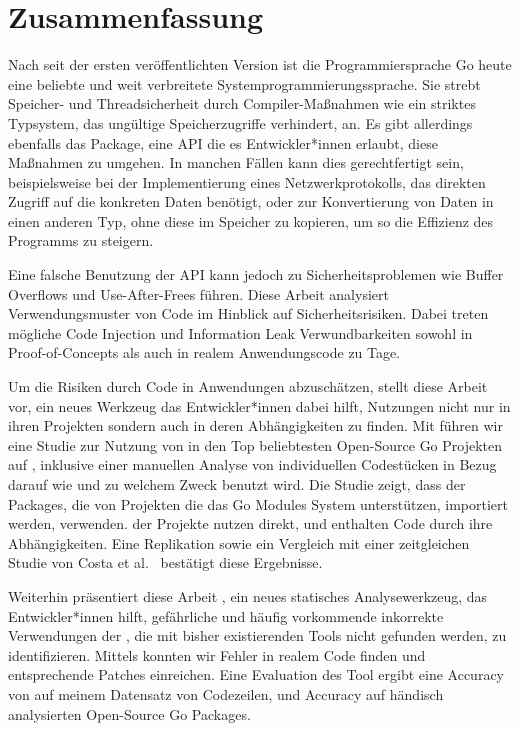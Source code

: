 \chapter*{Zusammenfassung}

Nach  seit der ersten veröffentlichten Version ist die Programmiersprache Go heute eine
beliebte und weit verbreitete Systemprogrammierungssprache.
Sie strebt Speicher- und Threadsicherheit durch Compiler-Maßnahmen wie ein striktes Typsystem, das
ungültige Speicherzugriffe verhindert, an.
Es gibt allerdings ebenfalls das \unsafe{} Package, eine API die es Entwickler*innen erlaubt, diese
Maßnahmen zu umgehen.
In manchen Fällen kann dies gerechtfertigt sein, beispielsweise bei der Implementierung eines
Netzwerkprotokolls, das direkten Zugriff auf die konkreten Daten benötigt, oder zur Konvertierung von Daten in einen
anderen Typ, ohne diese im Speicher zu kopieren, um so die Effizienz des Programms zu steigern.

Eine falsche Benutzung der \unsafe{} API kann jedoch zu Sicherheitsproblemen wie Buffer Overflows und Use-After-Frees
führen.
Diese Arbeit analysiert Verwendungsmuster von \unsafe{} Code im Hinblick auf Sicherheitsrisiken.
Dabei treten mögliche Code Injection und Information Leak Verwundbarkeiten sowohl in Proof-of-Concepts als auch in
realem Anwendungscode zu Tage.

Um die Risiken durch \unsafe{} Code in Anwendungen abzuschätzen, stellt diese Arbeit \toolGeiger{} vor, ein neues
Werkzeug das Entwickler*innen dabei hilft, \unsafe{} Nutzungen nicht nur in ihren Projekten sondern auch in deren
Abhängigkeiten zu finden.
Mit \toolGeiger{} führen wir eine Studie zur Nutzung von \unsafe{} in den Top \projsTotal{} beliebtesten Open-Source Go
Projekten auf \github{}, inklusive einer manuellen Analyse von \numberLabeledCodeSnippets{} individuellen Codestücken
in Bezug darauf wie und zu welchem Zweck \unsafe{} benutzt wird.
Die Studie zeigt, dass \percentageUnsafePackages{} der Packages, die von Projekten die das Go Modules System
unterstützen, importiert werden, \unsafe{} verwenden.
\percentageUnsafeProjects{} der Projekte nutzen \unsafe{} direkt, und \percentageUnsafeTransitiveWithDependencies{}
enthalten \unsafe{} Code durch ihre Abhängigkeiten.
Eine Replikation sowie ein Vergleich mit einer zeitgleichen Studie von Costa et al.~\cite{costa2020} bestätigt diese
Ergebnisse.

Weiterhin präsentiert diese Arbeit \toolSafer{}, ein neues statisches Analysewerkzeug, das Entwickler*innen hilft,
 gefährliche und häufig vorkommende inkorrekte Verwendungen der \unsafe{}, die mit bisher existierenden
Tools nicht gefunden werden, zu identifizieren.
Mittels \toolSafer{} konnten wir \numberBugsFixed{} Fehler in realem Code finden und entsprechende Patches einreichen.
Eine Evaluation des Tool ergibt eine Accuracy von \goSaferEvaluationDatasetGosaferAccuracy{} auf meinem Datensatz von
\unsafe{} Codezeilen, und \goSaferEvaluationPackagesGosaferAccuracy{} Accuracy auf händisch analysierten Open-Source
Go Packages.
